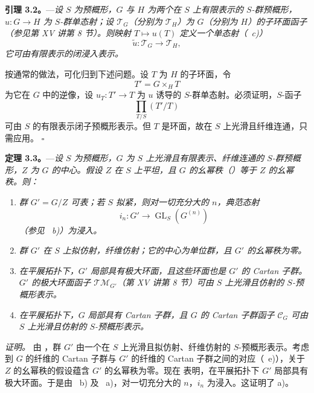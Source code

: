 \medskip
\noindent{}%
\textbf{引理 3.2。}---\textit{设 \(S\) 为预概形，\(G\) 与 \(H\) 为两个在 \(S\) 上有限表示的 \(S\)-群预概形，\(u:G\to H\) 为 \(S\)-群单态射；设 \(\mathscr T_G\)（分别为 \(\mathscr T_H\)）为 \(G\)（分别为 \(H\)）的子环面函子（参见第 XV 讲第 8 节）。则映射 \(T\mapsto u(T)\) 定义一个单态射（~c)）}
\[
  \widetilde u:\mathscr T_G\longrightarrow\mathscr T_H,
\]
\textit{它可由有限表示的闭浸入表示。}

按通常的做法，可化归到下述问题。设 \(T\) 为 \(H\) 的子环面，令
\[
  T'=G\times_H T
\]
为它在 \(G\) 中的逆像，设 \(u_T:T'\to T\) 为 \(u\) 诱导的 \(S\)-群单态射。必须证明，\(S\)-函子
\[
  \prod_{T/S}(T'/T)
\]
可由 \(S\) 的有限表示闭子预概形表示。但 \(T\) 是环面，故在 \(S\) 上光滑且纤维连通，只需应用。
\hfill\(\square\)

\medskip
\noindent{}%
\textbf{定理 3.3。}---\textit{设 \(S\) 为预概形，\(G\) 为 \(S\) 上光滑且有限表示、纤维连通的 \(S\)-群预概形，\(Z\) 为 \(G\) 的中心。假设 \(Z\) 在 \(S\) 上平坦，且 \(G\) 的幺幂秩（）等于 \(Z\) 的幺幂秩。则：}
\begin{enumerate}
\renewcommand{\labelenumi}{\textit{\alph{enumi})}}
\item \textit{群 \(G'=G/Z\) 可表；若 \(S\) 拟紧，则对一切充分大的 \(n\)，典范态射}
\[
  i_n:G'\longrightarrow\operatorname{GL}_S(G^{(n)})
\]
\textit{（参见 ~b)）为浸入。}
\item \textit{群 \(G'\) 在 \(S\) 上拟仿射，纤维仿射；它的中心为单位群，且 \(G'\) 的幺幂秩为零。}
\item \textit{在平展拓扑下，\(G'\) 局部具有极大环面，且这些环面也是 \(G'\) 的 Cartan 子群。\(G'\) 的极大环面函子 \(\mathscr{TM}_{G'}\)（第 XV 讲第 8 节）可由 \(S\) 上光滑且仿射的 \(S\)-预概形表示。}
\item \textit{在平展拓扑下，\(G\) 局部具有 Cartan 子群，且 \(G\) 的 Cartan 子群函子 \(\mathscr C_G\) 可由 \(S\) 上光滑且仿射的 \(S\)-预概形表示。}
\end{enumerate}

\medskip
\noindent\textit{证明。}
由 ，群 \(G'\) 由一个在 \(S\) 上光滑且拟仿射、纤维仿射的 \(S\)-预概形表示。考虑到 \(G\) 的纤维的 Cartan 子群与 \(G'\) 的纤维的 Cartan 子群之间的对应（~e)），关于 \(Z\) 的幺幂秩的假设蕴含 \(G'\) 的幺幂秩为零。现在 表明，在平展拓扑下 \(G'\) 局部具有极大环面。于是由 ~b) 及 ~a)，对一切充分大的 \(n\)，\(i_n\) 为浸入。这证明了 a)。

